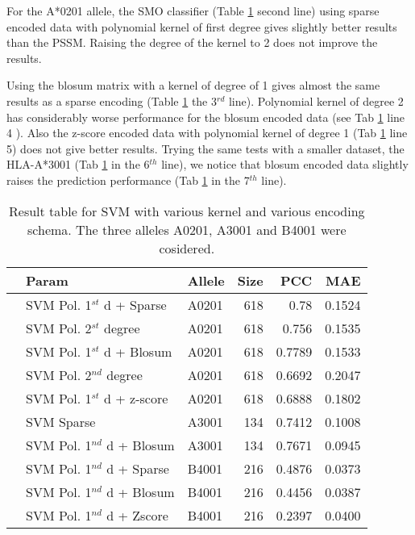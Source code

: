 For the A*0201 allele, the SMO classifier (Table \ref{tab:svm1} second line) using sparse encoded data with polynomial kernel of first degree gives slightly better results than the PSSM. Raising the degree of the kernel to 2 does not improve the results.

Using the blosum matrix with a kernel of degree of 1 gives almost the same results as a sparse encoding (Table \ref{tab:svm1} the 3$^{rd}$ line). Polynomial kernel of degree 2 has considerably worse performance for the blosum encoded data (see Tab \ref{tab:svm1} line 4 ). Also the z-score encoded data with polynomial kernel of degree 1 (Tab \ref{tab:svm1} line 5) does not give better results.
Trying the same tests with a smaller dataset, the HLA-A*3001 (Tab \ref{tab:svm1} in the 6$^{th}$ line), we notice that blosum encoded data slightly raises the prediction performance (Tab \ref{tab:svm1} in the 7$^{th}$ line).

\begin{table}[ht]\scriptsize
\begin{center}
\begin{tabular}{rllrrr}
  \hline
 & Param & Allele & Size & PCC & MAE \\ 
  \hline
 & SVM Pol. 1$^{st}$ d + Sparse & A0201 &   618 & 0.78 & 0.1524 \\ 
 & SVM Pol. 2$^{st}$ degree & A0201 &   618 & 0.756 & 0.1535 \\ 
 & SVM Pol. 1$^{st}$ d + Blosum & A0201 &   618 & 0.7789 & 0.1533 \\ 
 & SVM Pol. 2$^{nd}$ degree & A0201 &   618 & 0.6692 & 0.2047 \\ 
 & SVM Pol. 1$^{st}$ d + z-score & A0201 &   618 & 0.6888 & 0.1802 \\ 
 & SVM Sparse & A3001 &   134 & 0.7412 & 0.1008 \\ 
 & SVM Pol. 1$^{nd}$ d + Blosum & A3001 &   134 & 0.7671 & 0.0945 \\ 
 & SVM Pol. 1$^{nd}$ d + Sparse & B4001 &   216 & 0.4876 & 0.0373 \\ 
 & SVM Pol. 1$^{nd}$ d + Blosum & B4001 &   216 & 0.4456 & 0.0387 \\ 
 & SVM Pol. 1$^{nd}$ d + Zscore & B4001 &   216 & 0.2397 & 0.0400 \\ 
   \hline
\end{tabular}
\end{center}
\caption{Result table for SVM with various kernel and various encoding schema. The three alleles A0201, A3001 and B4001 were cosidered.}\label{tab:svm1}
\end{table}

